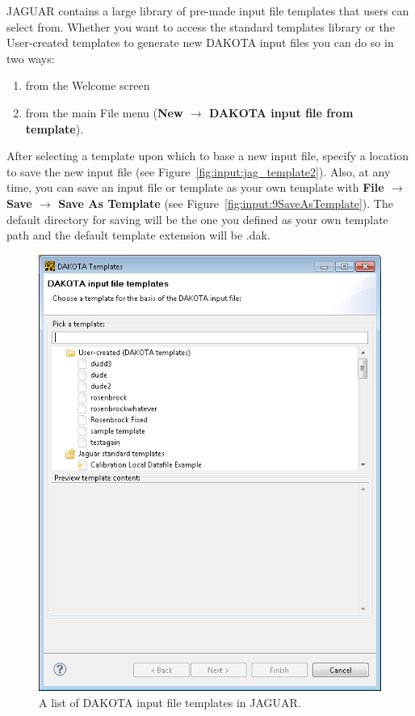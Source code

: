 JAGUAR contains a large library of pre-made input file templates that
users can select from. Whether you want to access the standard
templates library or the User-created templates to generate new DAKOTA
input files you can do so in two ways:
\begin{enumerate}
\item from the Welcome screen 
\item from the main File menu ({\bf New $\rightarrow$ DAKOTA input
  file from template}).
\end{enumerate}

After selecting a template upon which to base a new input file,
specify a location to save the new input file (see
Figure~\ref{fig:input:jag_template2}).  Also, at any time, you can
save an input file or template as your own template with {\bf File
  $\rightarrow$ Save $\rightarrow$ Save As Template} (see
Figure~\ref{fig:input:9SaveAsTemplate}). The default directory for
saving will be the one you defined as your own template path and the
default template extension will be .dak.
\begin{figure}
  \centering
  \includegraphics[scale=0.6]{images/2_1jag_template1}
  \caption{A list of DAKOTA input file templates in JAGUAR.}
  \label{fig:input:jag_template1}
\end{figure}
